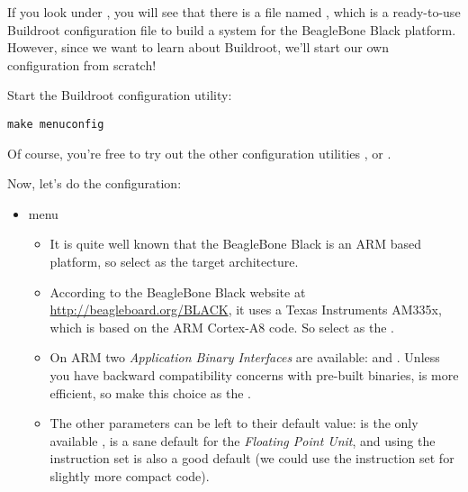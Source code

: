 If you look under , you will see that there is a file
named , which is a ready-to-use Buildroot
configuration file to build a system for the BeagleBone Black
platform. However, since we want to learn about Buildroot, we'll start
our own configuration from scratch!

Start the Buildroot configuration utility:

\begin{verbatim}
make menuconfig
\end{verbatim}

Of course, you're free to try out the other configuration utilities
,  or .

Now, let's do the configuration:

\begin{itemize}

\item {} menu

  \begin{itemize}

  \item It is quite well known that the BeagleBone Black is an ARM based
    platform, so select  as the target
    architecture.

  \item According to the BeagleBone Black website at
    \url{http://beagleboard.org/BLACK}, it uses a Texas Instruments
    AM335x, which is based on the ARM Cortex-A8 code. So select
     as the .

  \item On ARM two {\em Application Binary Interfaces} are available:
     and . Unless you have backward
    compatibility concerns with pre-built binaries,  is
    more efficient, so make this choice as the .

  \item The other parameters can be left to their default value:
     is the only available ,
     is a sane default for the {\em Floating Point
      Unit}, and using the  instruction set is also a good
    default (we could use the  instruction set for
    slightly more compact code).

  \end{itemize}


\end{itemize}

